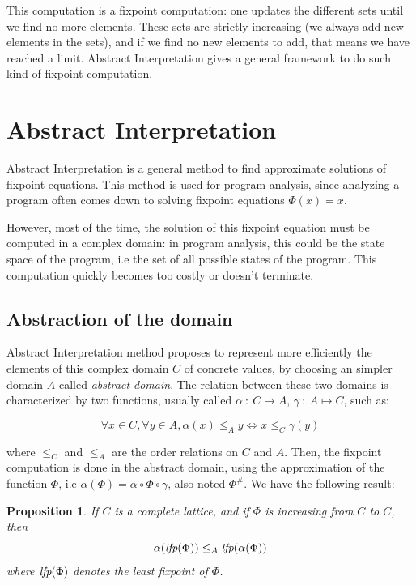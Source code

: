 \documentclass[a4paper,english,titlepage,11pt]{article}
\newtheorem{proposition}[theorem]{Proposition}
\def\lfp{\textnormal{\it lfp}}
\begin{document}
This computation is a fixpoint computation: one updates the different sets until
we find no more elements. These sets are strictly increasing (we always add new
elements in the sets), and if we find no new elements to add, that means we have
reached a limit. Abstract Interpretation gives a general framework to do such
kind of fixpoint computation.


\section{Abstract Interpretation}

Abstract Interpretation \cite{CC77,CousotCousot92-1} is a general method to find approximate solutions of
fixpoint equations. This method is used for program analysis, since analyzing a
program often comes down to solving fixpoint equations $\Phi(x) = x$.

However, most of the time, the solution of this fixpoint equation must be
computed in a complex domain: in program analysis, this could be the state space
of the program, i.e the set of all possible states of the program. This
computation quickly becomes too costly or doesn't terminate.

\subsection{Abstraction of the domain}

Abstract Interpretation method proposes to represent more efficiently the
elements of this complex domain $C$ of concrete values, by choosing an simpler
domain  $A$ called \emph{abstract domain}. The relation between these two
domains is characterized by two functions, usually called 
$\alpha\ :\ C \mapsto A$, $\gamma \ : \ A \mapsto C$, such as:

$$\forall x \in C, \forall y \in A, \alpha(x) \leq_{A} y \Leftrightarrow x
\leq_{C} \gamma(y) $$

where $\leq_C$ and $\leq_A$ are the order relations on $C$ and $A$. Then, the
fixpoint computation is done in the abstract domain, using the approximation of
the function $\Phi$, i.e $\alpha(\Phi) = \alpha \circ \Phi \circ \gamma$, also
noted $\Phi^\#$.
We have the following result:

\begin{proposition}
If $C$ is a complete lattice, and if $\Phi$ is increasing from $C$ to $C$, then
$$\alpha(\lfp(\Phi)) \leq_A \lfp(\alpha(\Phi))$$
where $\lfp(\Phi)$ denotes the least fixpoint of $\Phi$.
\end{proposition}
\end{document}
